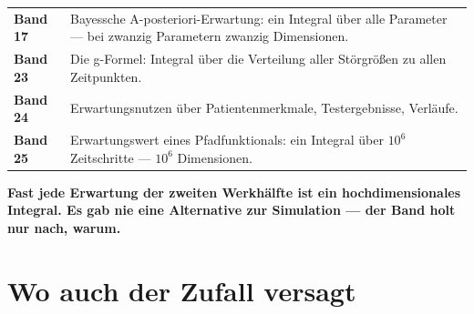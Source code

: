 \begin{merksatz}
\begin{center}
{\small
\renewcommand{\arraystretch}{1.5}
\begin{tabular}{@{}P{2.8cm}P{5.8cm}@{}}
\toprule
\textbf{Band 17} & Bayessche A-posteriori-Erwartung: ein Integral über alle Parameter --- bei zwanzig Parametern zwanzig Dimensionen.\\
\textbf{Band 23} & Die g-Formel: Integral über die Verteilung aller Störgrößen zu allen Zeitpunkten.\\
\textbf{Band 24} & Erwartungsnutzen über Patientenmerkmale, Testergebnisse, Verläufe.\\
\textbf{Band 25} & Erwartungswert eines Pfadfunktionals: ein Integral über $10^{6}$ Zeitschritte --- $10^{6}$ Dimensionen.\\
\bottomrule
\end{tabular}}
\end{center}

\begin{center}
\begin{minipage}{0.9\textwidth}
\textbf{Fast jede Erwartung der zweiten Werkhälfte ist ein hochdimensionales Integral. Es gab nie eine Alternative zur Simulation --- der Band holt nur nach, warum.}
\end{minipage}
\end{center}
\end{merksatz}

\section{Wo auch der Zufall versagt}

